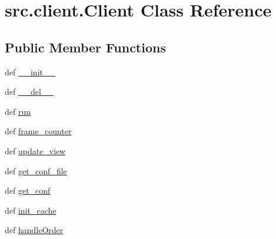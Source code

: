 \hypertarget{classsrc_1_1client_1_1_client}{\section{src.\-client.\-Client \-Class \-Reference}
\label{classsrc_1_1client_1_1_client}
}
\subsection*{\-Public \-Member \-Functions}
\begin{DoxyCompactItemize}
\item 
def \hyperlink{classsrc_1_1client_1_1_client_a63e0fbe31d7c47f64ef4e12628f0006f}{\-\_\-\-\_\-init\-\_\-\-\_\-}
\item 
def \hyperlink{classsrc_1_1client_1_1_client_aece67fa18be912de2d7e04840f63d161}{\-\_\-\-\_\-del\-\_\-\-\_\-}
\item 
def \hyperlink{classsrc_1_1client_1_1_client_a354370a9ad5054293c75e74e79c22280}{run}
\item 
def \hyperlink{classsrc_1_1client_1_1_client_a6ff2e05841d4fe56bf5d26200763a486}{frame\-\_\-counter}
\item 
def \hyperlink{classsrc_1_1client_1_1_client_a370da53c7c1f35d0915aea02f5435f29}{update\-\_\-view}
\item 
def \hyperlink{classsrc_1_1client_1_1_client_a4171be6bb67bd1bccfc962070cdd1ac5}{get\-\_\-conf\-\_\-file}
\item 
def \hyperlink{classsrc_1_1client_1_1_client_ae439afc621acd0aa5170187293d876bd}{get\-\_\-conf}
\item 
def \hyperlink{classsrc_1_1client_1_1_client_aa3c1f7c0648d506a18ef8cc15fa69107}{init\-\_\-cache}
\item 
def \hyperlink{classsrc_1_1client_1_1_client_af341ac55e0b5212451476ea2f69b45e7}{handle\-Order}
\end{DoxyCompactItemize}
